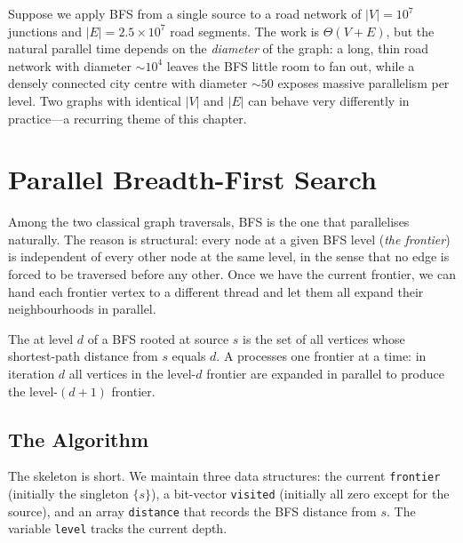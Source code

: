 \begin{ppexample}
Suppose we apply BFS from a single source to a road network of
$|V| = 10^7$ junctions and $|E| = 2.5 \times 10^7$ road segments.
The work is $\Theta(V + E)$, but the natural parallel time depends on
the \emph{diameter} of the graph: a long, thin road network with
diameter $\sim 10^4$ leaves the BFS little room to fan out, while a
densely connected city centre with diameter $\sim 50$ exposes massive
parallelism per level.  Two graphs with identical $|V|$ and $|E|$ can
behave very differently in practice---a recurring theme of this
chapter.
\end{ppexample}

\section{Parallel Breadth-First Search}

Among the two classical graph traversals, BFS is the one that
parallelises naturally.  The reason is structural: every node at a
given BFS level (\emph{the frontier}) is independent of every other
node at the same level, in the sense that no edge is forced to be
traversed before any other.  Once we have the current frontier, we can
hand each frontier vertex to a different thread and let them all
expand their neighbourhoods in parallel.

\begin{ppdefn}
The  at level $d$ of a BFS rooted at source $s$ is the
set of all vertices whose shortest-path distance from $s$ equals $d$.
A  processes one frontier at a
time: in iteration $d$ all vertices in the level-$d$ frontier are
expanded in parallel to produce the level-$(d{+}1)$ frontier.
\end{ppdefn}

\subsection{The Algorithm}

The skeleton is short.  We maintain three data structures: the current
\texttt{frontier} (initially the singleton $\{s\}$), a bit-vector
\texttt{visited} (initially all zero except for the source), and an
array \texttt{distance} that records the BFS distance from $s$.  The
variable \texttt{level} tracks the current depth.

